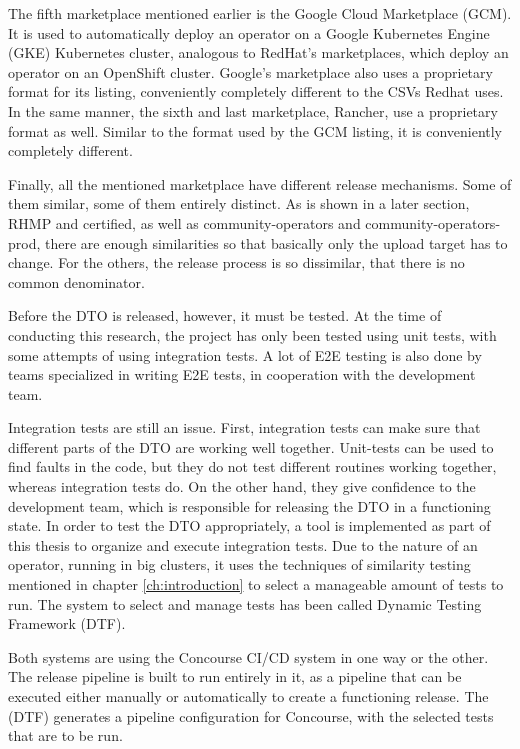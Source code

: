 The fifth marketplace mentioned earlier is the Google Cloud Marketplace (GCM).
It is used to automatically deploy an operator on a Google Kubernetes Engine (GKE) Kubernetes cluster, analogous to RedHat's marketplaces, which deploy an operator on an OpenShift cluster.
Google's marketplace also uses a proprietary format for its listing, conveniently completely different to the CSVs Redhat uses.
In the same manner, the sixth and last marketplace, Rancher, use a proprietary format as well.
Similar to the format used by the GCM listing, it is conveniently completely different.

Finally, all the mentioned marketplace have different release mechanisms.
Some of them similar, some of them entirely distinct.
As is shown in a later section, RHMP and certified, as well as community-operators and community-operators-prod, there are enough similarities so that basically only the upload target has to change.
For the others, the release process is so dissimilar, that there is no common denominator.

Before the DTO is released, however, it must be tested.
At the time of conducting this research, the project has only been tested using unit tests, with some attempts of using integration tests.
A lot of E2E testing is also done by teams specialized in writing E2E tests, in cooperation with the development team.

Integration tests are still an issue.
First, integration tests can make sure that different parts of the DTO are working well together.
Unit-tests can be used to find faults in the code, but they do not test different routines working together, whereas integration tests do.
On the other hand, they give confidence to the development team, which is responsible for releasing the DTO in a functioning state.
In order to test the DTO appropriately, a tool is implemented as part of this thesis to organize and execute integration tests.
Due to the nature of an operator, running in big clusters, it uses the techniques of similarity testing mentioned in chapter \ref{ch:introduction} to select a manageable amount of tests to run.
The system to select and manage tests has been called Dynamic Testing Framework (DTF).

Both systems are using the Concourse CI/CD system in one way or the other.
The release pipeline is built to run entirely in it, as a pipeline that can be executed either manually or automatically to create a functioning release.
The (DTF) generates a pipeline configuration for Concourse, with the selected tests that are to be run.
